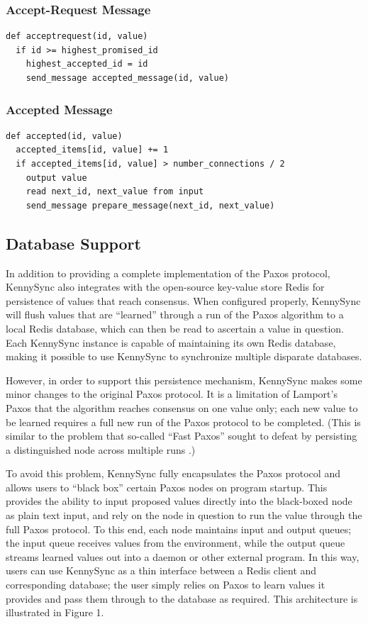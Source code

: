 \documentclass{acm_proc_article-sp}
\begin{document}
\subsubsection{Accept-Request Message}

\begin{verbatim}
def acceptrequest(id, value)
  if id >= highest_promised_id
    highest_accepted_id = id
    send_message accepted_message(id, value)
\end{verbatim}

\subsubsection{Accepted Message}

\begin{verbatim}
def accepted(id, value)
  accepted_items[id, value] += 1
  if accepted_items[id, value] > number_connections / 2
    output value
    read next_id, next_value from input
    send_message prepare_message(next_id, next_value)
\end{verbatim}

\subsection{Database Support}

In addition to providing a complete implementation of the Paxos protocol,
KennySync also integrates with the open-source key-value store Redis for
persistence of values that reach consensus. When configured properly, KennySync
will flush values that are ``learned'' through a run of the Paxos algorithm to
a local Redis database, which can then be read to ascertain a value in question.
Each KennySync instance is capable of maintaining its own Redis database, making
it possible to use KennySync to synchronize multiple disparate databases.

However, in order to support this persistence mechanism, KennySync makes some
minor changes to the original Paxos protocol. It is a limitation of Lamport's
Paxos that the algorithm reaches consensus on one value only; each new value to
be learned requires a full new run of the Paxos protocol to be completed. (This
is similar to the problem that so-called ``Fast Paxos'' sought to defeat by
persisting a distinguished node across multiple runs \cite{fast-paxos}.)

To avoid this problem, KennySync fully encapsulates the Paxos protocol and
allows users to ``black box'' certain Paxos nodes on program startup. This
provides the ability to input proposed values directly into the black-boxed node
as plain text input, and rely on the node in question to run the value through
the full Paxos protocol. To this end, each node maintains input and output
queues; the input queue receives values from the environment, while the output
queue streams learned values out into a daemon or other external program. In
this way, users can use KennySync as a thin interface between a Redis client and
corresponding database; the user simply relies on Paxos to learn values it
provides and pass them through to the database as required. This architecture is
illustrated in Figure 1.
\end{document}
